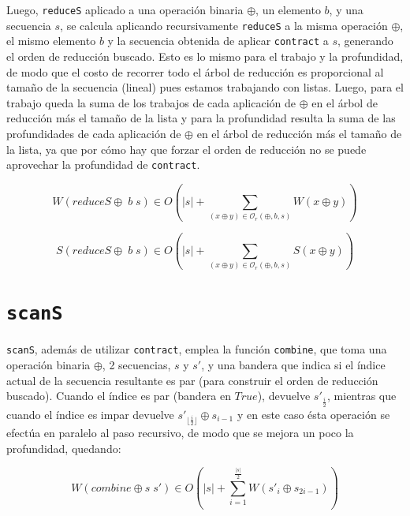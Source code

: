 \documentclass[a4paper,10pt]{article}
\begin{document}
Luego, \texttt{reduceS} aplicado a una operación binaria $\oplus$, un elemento $b$,
y una secuencia $s$, se calcula aplicando recursivamente \texttt{reduceS} a la
misma operación $\oplus$, el mismo elemento $b$ y la secuencia obtenida de aplicar
\texttt{contract} a $s$, generando el orden de reducción buscado. Esto es lo mismo
para el trabajo y la profundidad, de modo que el costo de recorrer todo el árbol
de reducción es proporcional al tamaño de la secuencia (lineal) pues estamos
trabajando con listas. Luego, para el trabajo queda la suma de los trabajos de
cada aplicación de $\oplus$ en el árbol de reducción más el tamaño de la lista y
para la profundidad resulta la suma de las profundidades de cada aplicación de
$\oplus$ en el árbol de reducción más el tamaño de la lista, ya que por cómo hay
que forzar el orden de reducción no se puede aprovechar la profundidad de \texttt{contract}.

\newpage

\begin{equation*}
    W \left( reduceS \oplus \; b \; s \right) \in
    O \left( \vert s \vert + \sum_{(x \oplus y) \in \mathcal{O}_r(\oplus,b,s)} W \left( x \oplus y \right) \right)
\end{equation*}

\begin{equation*}
    S \left( reduceS \oplus \; b \; s \right) \in
    O \left( \vert s \vert + \sum_{(x \oplus y) \in \mathcal{O}_r(\oplus,b,s)} S \left( x \oplus y \right) \right)
\end{equation*}

\section*{\texttt{scanS}}

\texttt{scanS}, además de utilizar \texttt{contract}, emplea la función \texttt{combine},
que toma una operación binaria $\oplus$, 2 secuencias, $s$ y $s'$, y una bandera
que indica si el índice actual de la secuencia resultante es par (para construir
el orden de reducción buscado). Cuando el índice es par (bandera en $True$),
devuelve $s'_{\frac{i}{2}}$, mientras que cuando el índice es impar devuelve
$s'_{\lfloor \frac{i}{2} \rfloor} \oplus s_{i-1}$ y en este caso ésta operación
se efectúa en paralelo al paso recursivo, de modo que se mejora un poco la
profundidad, quedando:

\begin{equation*}
    W \left( combine \oplus s \; s' \right) \in
    O \left( \vert s \vert + \sum_{i=1}^{\frac{\vert s \vert}{2}} W \left( s'_{i} \oplus s_{2i - 1} \right) \right)
\end{equation*}
\end{document}
